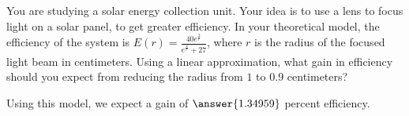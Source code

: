 \documentclass{ximera}
\author{Steven Gubkin}
\begin{document}
\begin{exercise}



You are studying a solar energy collection unit.  Your idea is to use a lens to focus light on a solar panel, to get greater efficiency.  In your theoretical model, the efficiency of the system is $E(r) = \frac{40e^{\frac{2}{r}}}{e^{\frac{2}{r}}+27}$, where $r$ is the radius of the focused light beam in centimeters.  Using a linear approximation, what gain in efficiency should you expect from reducing the radius from $1$ to $0.9$ centimeters? 

\begin{prompt}
	Using this model, we expect a gain of $\answer{1.34959} $ percent efficiency.
\end{prompt}

\end{exercise}
\end{document}
